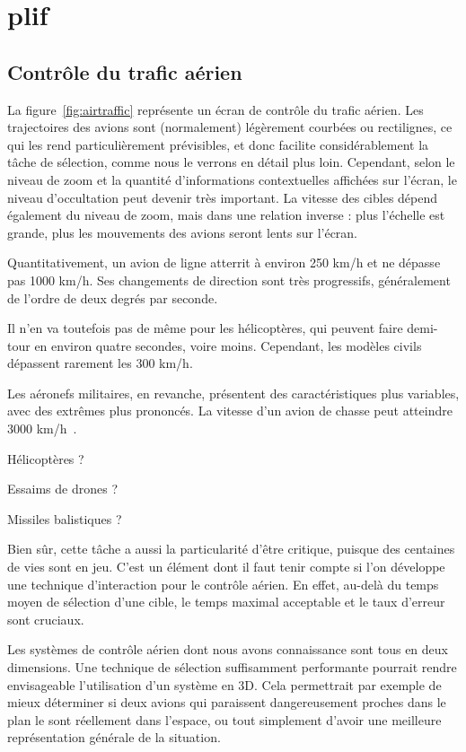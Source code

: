 
\chapter[Contexte/Besoin/Applications]{plif}
\minitoc
\label{chap1}
\cleardoublepage

	\section{Contrôle du trafic aérien}
	La figure~\ref{fig:airtraffic} représente un écran de contrôle du trafic aérien. Les trajectoires des avions sont (normalement) légèrement courbées ou rectilignes, ce qui les rend particulièrement prévisibles, et donc facilite considérablement la tâche de sélection, comme nous le verrons en détail plus loin. Cependant, selon le niveau de zoom et la quantité d'informations contextuelles affichées sur l'écran, le niveau d'occultation peut devenir très important. La vitesse des cibles dépend également du niveau de zoom, mais dans une relation inverse : plus l'échelle est grande, plus les mouvements des avions seront lents sur l'écran.
    
	Quantitativement, un avion de ligne atterrit à environ 250 km/h et ne dépasse pas 1000 km/h. Ses changements de direction sont très progressifs, généralement de l'ordre de deux degrés par seconde.
    
	Il n'en va toutefois pas de même pour les hélicoptères, qui peuvent faire demi-tour en environ quatre secondes, voire moins. Cependant, les modèles civils dépassent rarement les 300 km/h.
	
	Les aéronefs militaires, en revanche, présentent des caractéristiques plus variables, avec des extrêmes plus prononcés. La vitesse d'un avion de chasse peut atteindre 3000 km/h~\cite{mig31}.
	
   
    Hélicoptères ?
    
    Essaims de drones ?
    
    Missiles balistiques ?

	Bien sûr, cette tâche a aussi la particularité d'être critique, puisque des centaines de vies sont en jeu. C'est un élément dont il faut tenir compte si l'on développe une technique d'interaction pour le contrôle aérien. En effet, au-delà du temps moyen de sélection d'une cible, le temps maximal acceptable et le taux d'erreur sont cruciaux.
    
	Les systèmes de contrôle aérien dont nous avons connaissance sont tous en deux dimensions. Une technique de sélection suffisamment performante pourrait rendre envisageable l'utilisation d'un système en 3D. Cela permettrait par exemple de mieux déterminer si deux avions qui paraissent dangereusement proches dans le plan le sont réellement dans l'espace, ou tout simplement d'avoir une meilleure représentation générale de la situation.
    
